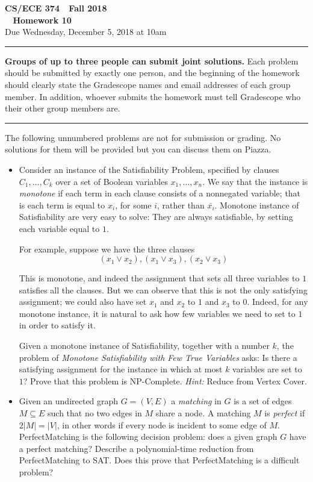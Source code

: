 \documentclass[11pt]{article}
\begin{document}

\thispagestyle{empty}

\begin{center}
\Large\textbf{CS/ECE 374 \,\decosix\,  Fall 2018}%
\\
\LARGE\textbf{\decothreeleft~ Homework 10 ~\decothreeright}%
\\[0.5ex]
\large Due Wednesday, December 5, 2018 at 10am
\end{center}

\bigskip
\hrule
\bigskip

\noindent
\textbf{Groups of up to three people can submit joint solutions.}
Each problem should be submitted by exactly one person, and the
beginning of the homework should clearly state the Gradescope names
and email addresses of each group member.  In addition, whoever
submits the homework must tell Gradescope who their other group
members are.
\bigskip \hrule \bigskip


\noindent
The following unnumbered problems are not for submission or grading.
No solutions for them will be provided but you can discuss them on Piazza.
\begin{itemize}
\item Consider an instance of the Satisfiability Problem, specified by clauses $C_1,\dots,C_k$ over a set of Boolean variables $x_1,\dots,x_n$. We say that the instance is {\em monotone} if each term in each clause consists of a nonnegated variable; that is each term is equal to $x_i$, for some $i$, rather than $\bar{x_i}$. Monotone instance of Satisfiability are very easy to solve: They are always satisfiable, by setting each variable equal to $1$.

For example, suppose we have the three clauses
$$(x_1\vee x_2),(x_1\vee x_3),(x_2\vee x_3)$$

This is monotone, and indeed the assignment that sets all three variables to $1$ satisfies all the clauses. But we can observe that this is not the only satisfying assignment; we could also have set $x_1$ and $x_2$ to $1$ and $x_3$ to $0$. Indeed, for any monotone instance, it is natural to ask how few variables we need to set to $1$ in order to satisfy it.

Given a monotone instance of Satisfiability, together with a number $k$, the problem of {\em Monotone Satisfiability with Few True Variables} asks: Is there a satisfying assignment for the instance in which at most $k$ variables are set to $1$? Prove that this problem is NP-Complete. {\em Hint:} Reduce from
Vertex Cover.

\item
 Given an undirected graph $G=(V,E)$ a {\em matching} in $G$ is
  a set of edges $M \subseteq E$ such that no two edges in $M$ share
  a node. A matching $M$ is {\em perfect} if $2|M| = |V|$, in other words
  if every node is incident to some edge of $M$. PerfectMatching is
  the following decision problem: does a given graph $G$ have a perfect
  matching? Describe a polynomial-time reduction from PerfectMatching to
  SAT. Does this prove that PerfectMatching is a difficult problem?

\end{itemize}
\end{document}
